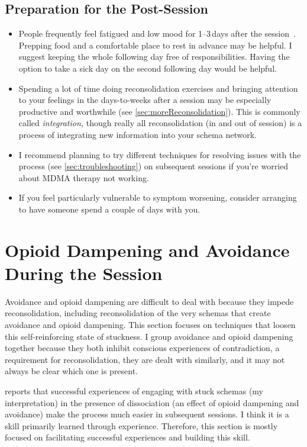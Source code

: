 \documentclass[11pt,oneside]{book}
\let\cite\parencite
\begin{document}
\subsection*{Preparation for the Post-Session}
\begin{itemize}
    \item People frequently feel fatigued and low mood for 1--3\,days after the session~\cite{liechtiGender}. Prepping food and a comfortable place to rest in advance may be helpful. I suggest keeping the whole following day free of responsibilities. Having the option to take a sick day on the second following day would be helpful.
    \item Spending a lot of time doing reconsolidation exercises and bringing attention to your feelings in the days-to-weeks after a session may be especially productive and worthwhile (see \cref{sec:moreReconsolidation}). This is commonly called \textit{integration,} though really all reconsolidation (in and out of session) is a process of integrating new information into your schema network.
    \item I recommend planning to try different techniques for resolving issues with the process (see \cref{sec:troubleshooting}) on subsequent sessions if you're worried about MDMA therapy not working.
    \item If you feel particularly vulnerable to symptom worsening, consider arranging to have someone spend a couple of days with you.
\end{itemize}

\section{Opioid Dampening and Avoidance During the Session}
\label{sec:sessionbarriers}
Avoidance and opioid dampening are difficult to deal with because they impede reconsolidation, including reconsolidation of the very schemas that create avoidance and opioid dampening. This section focuses on techniques that loosen this self-reinforcing state of stuckness. I group avoidance and opioid dampening together because they both inhibit conscious experiences of contradiction, a requirement for reconsolidation, they are dealt with similarly, and it may not always be clear which one is present.

\textcite{razviPSIP} reports that successful experiences of engaging with stuck schemas (my interpretation) in the presence of dissociation (an effect of opioid dampening and avoidance) make the process much easier in subsequent sessions. I think it is a skill primarily learned through experience. Therefore, this section is mostly focused on facilitating successful experiences and building this skill.
\end{document}
